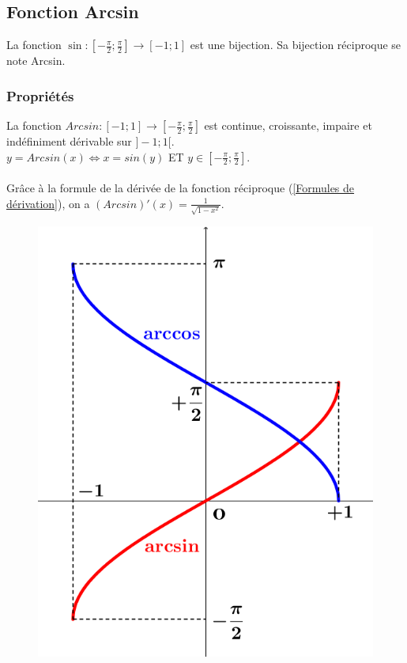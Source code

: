 \documentclass[a4paper,10pt]{book}
\begin{document}
\subsection{Fonction Arcsin}
La fonction $\sin : [-\frac{\pi}{2} ; \frac{\pi}{2}] \longrightarrow [-1;1]$ est une bijection. Sa bijection réciproque se note Arcsin.

\subsubsection{Propriétés}
La fonction $Arcsin : [-1;1] \longrightarrow [-\frac{\pi}{2} ; \frac{\pi}{2}]$ est continue, croissante, impaire et indéfiniment dérivable sur $]-1;1[$.\\
$y=Arcsin(x) \Leftrightarrow x=sin(y)$ ET $y \in [-\frac{\pi}{2} ; \frac{\pi}{2}]$.\\\\
Grâce à la formule de la dérivée de la fonction réciproque (\ref{Formules de dérivation}), on a $(Arcsin)'(x)=\frac{1}{\sqrt{1-x^{2}}}$.

\begin{figure} \includegraphics[scale=1.5]{images/015.png} \end{figure}
\end{document}
